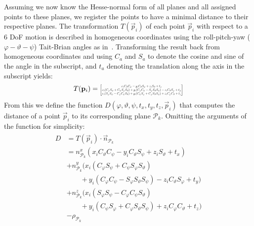 Assuming we now know the Hesse-normal form of all planes and all assigned points to these planes, we register the points to have a minimal distance to their respective planes.
The transformation $T(\vec{p}_i)$ of each point $\vec{p}_i$ with respect to a 6 DoF motion is described in homogeneous coordinates using the roll-pitch-yaw ($\varphi-\vartheta-\psi$) Tait-Brian angles as in~\cite{diebel2006representing}. Transforming the result back from homogeneous coordinates and using $C_a$ and $S_a$ to denote the cosine and sine of the angle in the subscript, and $t_a$ denoting the translation along the axis in the subscript yields:
\begin{align}
	T(\vec{p}_i)  =
    \resizebox{0.35\textwidth}{!}{$\begin{bmatrix}
        x_i C_\vartheta C_\psi - y_iC_\vartheta S_\psi + z_i S_\vartheta + t_x\\
        x_i (C_\varphi S_\psi + C_\psi S_\varphi S_\vartheta) + y_i(C_\varphi C_\psi - S_\varphi S_\vartheta S_\psi) - z_i C_\vartheta S_\varphi + t_y\\
        x_i(S_\varphi S_\psi - C_\varphi C_\psi S_\vartheta) + y_i(C_\psi S_\varphi + C_\varphi S_\vartheta S_\psi) + z_i C_\varphi C_\vartheta + t_z
    \end{bmatrix}$}
\end{align}
From this we define the function $D(\varphi,\vartheta,\psi,t_x,t_y,t_z, \vec{p}_i)$ that computes the distance of a point $\vec{p}_i$ to its corresponding plane $\mathcal{P}_k$.
Omitting the arguments of the function for simplicity:
\begin{align}
\begin{aligned}
    D &= T(\vec{p}_i) \cdot \vec{n}_{\mathcal{P}_k} \\
      &= n_{\mathcal{P}_k}^x (x_i C_\vartheta C_\psi - y_iC_\vartheta S_\psi + z_i S_\vartheta + t_x)\\
       &+ n_{\mathcal{P}_k}^y(x_i (C_\varphi S_\psi + C_\psi S_\varphi S_\vartheta)\\
       &\qquad+ y_i(C_\varphi C_\psi - S_\varphi S_\vartheta S_\psi) - z_i C_\vartheta S_\varphi + t_y)\\
       &+ n_{\mathcal{P}_k}^z (x_i(S_\varphi S_\psi - C_\varphi C_\psi S_\vartheta)\\
       &\qquad+ y_i(C_\psi S_\varphi + C_\varphi S_\vartheta S_\psi) + z_i C_\varphi C_\vartheta + t_z)\\
       &- \rho_{\mathcal{P}_k}
\end{aligned}
\end{align}

